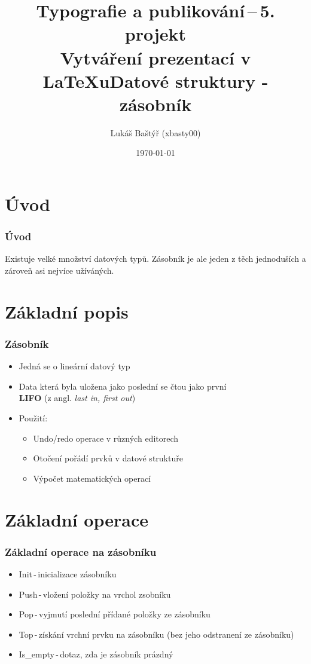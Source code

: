 \documentclass[unicode, breaklinks]{beamer}
\title{Typografie a publikování\,--\,5. projekt \\
       Vytváření prezentací v LaTeXu}
\author{Lukáš Baštýř (xbasty00)}
\institute{Vysoké učení technické v Brně\\
           Fakulta informačních technologií}
\date{\today}
\begin{document}
    \frame{\titlepage}
    
    \title{Datové struktury - zásobník}
    
    \frame{\titlepage}

    \frame{\tableofcontents}

    \section{Úvod}
    \begin{frame}
        \frametitle{Úvod}
        Existuje velké množství datových typů. Zásobník je ale jeden z těch jednoduších a zároveň asi nejvíce užíváných.
    \end{frame}
    
    \section{Základní popis}
    \begin{frame}
        \frametitle{Zásobník}
        \begin{itemize}
            \item Jedná se o lineární datový typ
            \item Data která byla uložena jako poslední se čtou jako první\\ \textbf{LIFO} (z angl. \emph{last in, first out})
            \item Použití:
            \begin{itemize}
                \item Undo/redo operace v různých editorech
                \item Otočení pořádí prvků v datové struktuře
                \item Výpočet matematických operací
            \end{itemize}
        \end{itemize}
    \end{frame}

    \section{Základní operace}
        \begin{frame}
            \frametitle{Základní operace na zásobníku}
            \begin{itemize}
                \item Init\,-\,inicializace zásobníku
                \item Push\,-\,vložení položky na vrchol zsobníku
                \item Pop\,-\,vyjmutí poslední přídané položky ze zásobníku 
                \item Top\,-\,získání vrchní prvku na zásobníku (bez jeho odstranení ze     zásobníku)
        \item Is\_empty\,-\,dotaz, zda je zásobník prázdný
    \end{itemize}
    \end{frame}
\end{document}
